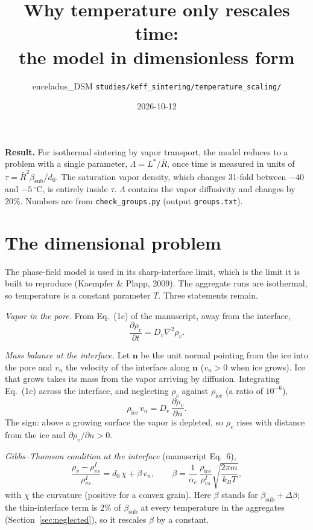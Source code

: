 \documentclass[11pt]{article}
\title{Why temperature only rescales time:\\ the model in dimensionless form}
\author{enceladus\_DSM \quad \texttt{studies/keff\_sintering/temperature\_scaling/}}
\date{2026-10-12}
\begin{document}
\maketitle

\textbf{Result.} For isothermal sintering by vapor transport, the model
reduces to a problem with a single parameter, $\Lambda = L^{*}/\bar R$, once
time is measured in units of $\tau = \bar R^{2}\beta_{\mathrm{sub}}/d_0$. The
saturation vapor density, which changes 31-fold between $-40$ and
$-5\,^{\circ}$C, is entirely inside $\tau$. $\Lambda$ contains the vapor
diffusivity and changes by 20\%. Numbers are from
\texttt{check\_groups.py} (output \texttt{groups.txt}).

\section{The dimensional problem}

The phase-field model is used in its sharp-interface limit, which is the limit
it is built to reproduce (Kaempfer \& Plapp, 2009). The aggregate runs are
isothermal, so temperature is a constant parameter $T$. Three statements
remain.

\emph{Vapor in the pore.} From Eq.~(1c) of the manuscript, away from the
interface,
\begin{equation}
\frac{\partial \rho_v}{\partial t} = D_v \nabla^{2}\rho_v .
\label{eq:diff}
\end{equation}

\emph{Mass balance at the interface.} Let $\mathbf n$ be the unit normal
pointing from the ice into the pore and $v_n$ the velocity of the interface
along $\mathbf n$ ($v_n > 0$ when ice grows). Ice that grows takes its mass
from the vapor arriving by diffusion. Integrating Eq.~(1c) across the
interface, and neglecting $\rho_v$ against $\rho_{\mathrm{ice}}$ (a ratio of
$10^{-6}$),
\begin{equation}
\rho_{\mathrm{ice}}\, v_n = D_v\, \frac{\partial \rho_v}{\partial n} .
\label{eq:stefan}
\end{equation}
The sign: above a growing surface the vapor is depleted, so $\rho_v$ rises
with distance from the ice and $\partial\rho_v/\partial n > 0$.

\emph{Gibbs--Thomson condition at the interface} (manuscript Eq.~6),
\begin{equation}
\frac{\rho_v - \rho_{vs}^{I}}{\rho_{vs}^{I}} = d_0\,\chi + \beta\, v_n ,
\qquad
\beta = \frac{1}{\alpha_c}\,\frac{\rho_{\mathrm{ice}}}{\rho_{vs}^{I}}\sqrt{\frac{2\pi m}{k_B T}} ,
\label{eq:gt}
\end{equation}
with $\chi$ the curvature (positive for a convex grain). Here $\beta$ stands
for $\beta_{\mathrm{sub}} + \Delta\beta$; the thin-interface term is 2\% of
$\beta_{\mathrm{sub}}$ at every temperature in the aggregates
(Section~\ref{sec:neglected}), so it rescales $\beta$ by a constant.
\end{document}
